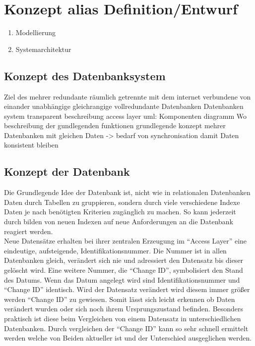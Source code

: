 \documentclass[a4paper,11pt,oneside,%
headsepline,												%
footsepline,												%
bibtotocnumbered									%
]{scrreprt}
\begin{document}
\chapter{Konzept alias Definition/Entwurf}

		\begin{enumerate}[1.]
			\item Modellierung
			\item Systemarchitektur
		\end{enumerate}
		
\section{Konzept des Datenbanksystem}
Ziel des
mehrer redundante räumlich getrennte mit dem internet verbundene von einander unabhängige gleichrangige vollredundante Datenbanken
Datenbanken system transparent
beschreibung access layer
uml: Komponenten diagramm
Wo beschreibung der gundlegenden funktionen
grundlegende konzept mehrer Datenbanken mit gleichen Daten -> bedarf von synchronisation damit Daten konsistent bleiben

\section{Konzept der Datenbank}
Die Grundlegende Idee der Datenbank ist, nicht wie in relationalen Datenbanken Daten durch Tabellen zu gruppieren, sondern durch viele verschiedene Indexe Daten je nach benötigten Kriterien  zugänglich zu machen. So kann jederzeit durch bilden von neuen Indexen auf neue Anforderungen an die Datenbank reagiert werden.\\

Neue Datensätze erhalten bei ihrer zentralen Erzeugung im \enquote{Access Layer} eine eindeutige, aufsteigende, Identifikationsnummer. Die Nummer ist in allen Datenbanken gleich, verändert sich nie und adressiert den Datensatz bis dieser gelöscht wird. Eine weitere Nummer, die \enquote{Change ID}, symbolisiert den Stand des Datums. Wenn das Datum angelegt wird sind Identifikationsnummer und \enquote{Change ID} identisch. Wird der Datensatz verändert wird diesem immer größer werden \enquote{Change ID} zu gewiesen. Somit lässt sich leicht erkennen ob Daten verändert wurden oder sich noch ihrem Ursprungszustand befinden. Besonders praktisch ist diese beim Vergleichen von einem Datensatz in unterschiedlichen Datenbanken. Durch vergleichen der \enquote{Change ID} kann so sehr schnell ermittelt werden welche von Beiden aktueller ist und der Unterschied ausgeglichen werden.\\
\end{document}
